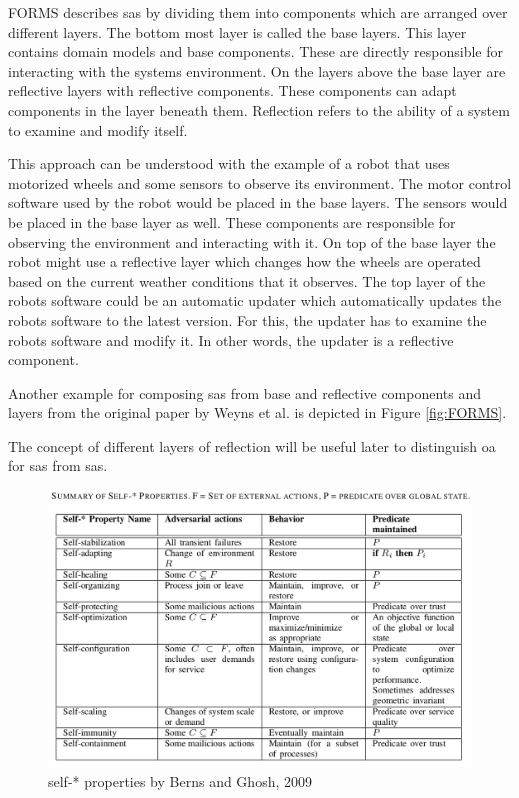 FORMS describes \acrshort{sas} by dividing them into components which are arranged over different layers.
The bottom most layer is called the base layers.
This layer contains domain models and base components.
These are directly responsible for interacting with the systems environment.
On the layers above the base layer are reflective layers with reflective components.
These components can adapt components in the layer beneath them.
Reflection refers to the ability of a system to examine and modify itself.

This approach can be understood with the example of a robot that uses motorized wheels
and some sensors to observe its environment.
The motor control software used by the robot would be placed in the base layers.
The sensors would be placed in the base layer as well.
These components are responsible for observing the environment and interacting with it.
On top of the base layer the robot might use a reflective layer which changes how the wheels are operated
based on the current weather conditions that it observes.
The top layer of the robots software could be an automatic updater 
which automatically updates the robots software to the latest version.
For this, the updater has to examine the robots software and modify it.
In other words, the updater is a reflective component.

Another example for composing \acrshort{sas} from base and reflective components and layers
from the original paper by Weyns et al. is depicted in Figure \ref{fig:FORMS}.

\noindent The concept of different layers of reflection will be useful later to distinguish
\acrshort{oa} for \acrshort{sas} from \acrshort{sas}.

\begin{figure}[t!]
    \includegraphics[width=\textwidth]{images/SelfProperties.png}
    \caption{self-* properties by Berns and Ghosh, 2009 \cite*{DissectingSelfProperties}}
    \label{fig:SelfProperties}
\end{figure}

